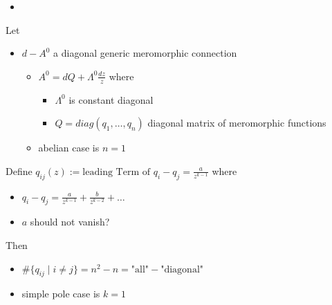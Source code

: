 \begin{frame}
  {\Huge\insertsection{}}
  \begin{itemize}
    \item \cite{boalch}
  \end{itemize}
Let
\begin{itemize}
  \item $d-A^0$ a diagonal generic meromorphic connection
    \begin{itemize}
      \item $A^0=dQ+\Lambda^0\frac{dz}{z}$ where
        \begin{itemize}
          \item $\Lambda^0$ is constant diagonal
          \item $Q=diag(q_1,\dots,q_n)$ diagonal matrix of meromorphic functions
        \end{itemize}
      \item abelian case is $n=1$
    \end{itemize}
  \end{itemize}
  Define $q_{ij}(z):=\text{leading Term of }q_i-q_j = \frac{a}{z^{k-1}}$ where
  \begin{itemize}
    \item $q_i-q_j = \frac{a}{z^{k-1}} + \frac{b}{z^{k-2}}+\dots$
    \item $a$ should \textcolor{red!60!black}{not vanish?}
  \end{itemize}
  Then
  \begin{itemize}
    \item $\#\{q_{ij}\mid i \neq j\}=n^2-n=\text{"all"}-\text{"diagonal"}$
    \item simple pole case is $k=1$
  \end{itemize}
\end{frame}

